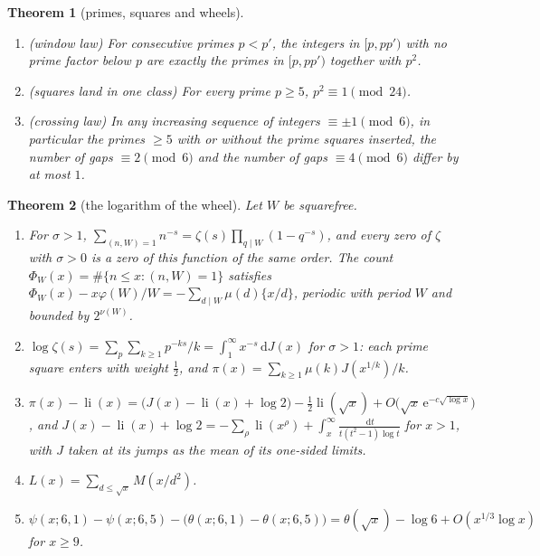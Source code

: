 \documentclass[11pt]{article}
\newtheorem{theorem}{Theorem}[section]
\theoremstyle{definition}\newtheorem{definition}[theorem]{Definition}
\theoremstyle{remark}\newtheorem{remark}[theorem]{Remark}
\theoremstyle{definition}\newtheorem{axiom}{Axiom}
\newcommand{\dd}{\,\mathrm d}\newcommand{\e}{\mathrm e}
\newcommand{\fr}[1]{\{#1\}}
\newcommand{\li}{\operatorname{li}}\newcommand{\Tr}{\operatorname{Tr}}
\begin{document}
\begin{theorem}[primes, squares and wheels]\label{mt:gaps}
\begin{enumerate}[label=\textup{(\roman*)}]
\item \textup{(window law)} For consecutive primes $p<p'$, the integers in $[p,pp')$ with no prime factor below $p$ are exactly the primes in $[p,pp')$ together with $p^2$.
\item \textup{(squares land in one class)} For every prime $p\ge5$, $p^2\equiv1\pmod{24}$.
\item \textup{(crossing law)} In any increasing sequence of integers $\equiv\pm1\pmod6$, in particular the primes $\ge5$ with or without the prime squares inserted, the number of gaps $\equiv2\pmod6$ and the number of gaps $\equiv4\pmod6$ differ by at most $1$.
\end{enumerate}
\end{theorem}

\begin{theorem}[the logarithm of the wheel]\label{mt:wheel}
Let $W$ be squarefree.
\begin{enumerate}[label=\textup{(\roman*)}]
\item For $\sigma>1$, $\sum_{(n,W)=1}n^{-s}=\zeta(s)\prod_{q\mid W}(1-q^{-s})$, and every zero of $\zeta$ with $\sigma>0$ is a zero of this function of the same order. The count $\Phi_W(x)=\#\{n\le x:(n,W)=1\}$ satisfies $\Phi_W(x)-x\varphi(W)/W=-\sum_{d\mid W}\mu(d)\fr{x/d}$, periodic with period $W$ and bounded by $2^{\nu(W)}$.
\item $\log\zeta(s)=\sum_p\sum_{k\ge1}p^{-ks}/k=\int_1^\infty x^{-s}\dd J(x)$ for $\sigma>1$: each prime square enters with weight $\frac12$, and $\pi(x)=\sum_{k\ge1}\mu(k)J(x^{1/k})/k$.
\item $\pi(x)-\li(x)=\bigl(J(x)-\li(x)+\log2\bigr)-\tfrac12\li(\sqrt x)+O\bigl(\sqrt x\,\e^{-c\sqrt{\log x}}\bigr)$, and $J(x)-\li(x)+\log2=-\sum_\rho\li(x^\rho)+\int_x^\infty\frac{\dd t}{t(t^2-1)\log t}$ for $x>1$, with $J$ taken at its jumps as the mean of its one-sided limits.
\item $L(x)=\sum_{d\le\sqrt x}M(x/d^2)$.
\item $\psi(x;6,1)-\psi(x;6,5)-\bigl(\theta(x;6,1)-\theta(x;6,5)\bigr)=\theta(\sqrt x)-\log6+O(x^{1/3}\log x)$ for $x\ge9$.
\end{enumerate}
\end{theorem}
\end{document}
